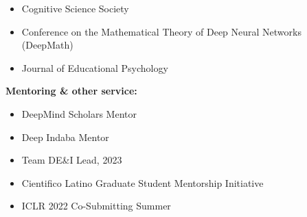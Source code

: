 \documentclass[margin]{res}
\begin{document}
\begin{resume}
\begin{itemize}
 \item Cognitive Science Society
 \item Conference on the Mathematical Theory of Deep Neural Networks (DeepMath)
 \item Journal of Educational Psychology
 \end{itemize}
{\bf Mentoring \& other service:} 
\begin{itemize} \itemsep -2pt
 \item DeepMind Scholars Mentor
 \item Deep Indaba Mentor
 \item Team DE\&I Lead, 2023 
 \item Cientifico Latino Graduate Student Mentorship Initiative
 \item ICLR 2022 Co-Submitting Summer
\end{itemize}

\end{resume}
\end{document}
